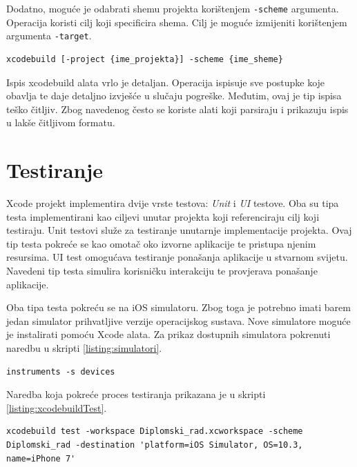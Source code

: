 \documentclass[times, utf8, diplomski, numeric]{fer}
\begin{document}
\begin{appendices}
Dodatno, moguće je odabrati shemu projekta korištenjem \verb|-scheme| argumenta. Operacija koristi cilj koji specificira shema. Cilj je moguće izmijeniti korištenjem argumenta \verb|-target|.

\begin{lstlisting}[caption=Odabir sheme projekta]
xcodebuild [-project {ime_projekta}] -scheme {ime_sheme}
\end{lstlisting}

Ispis xcodebuild alata vrlo je detaljan. Operacija ispisuje sve postupke koje obavlja te daje detaljno izvješće u slučaju pogreške. Međutim, ovaj je tip ispisa teško čitljiv. Zbog navedenog često se koriste alati koji parsiraju i prikazuju ispis u lakše čitljivom formatu.

\section{Testiranje} \label{TestiranjeXcodeBuild}

Xcode projekt implementira dvije vrste testova: \textit{Unit} i \textit{UI} testove. Oba su tipa testa implementirani kao ciljevi unutar projekta koji referenciraju cilj koji testiraju. Unit testovi služe za testiranje unutarnje implementacije projekta. Ovaj tip testa pokreće se kao omotač oko izvorne aplikacije te pristupa njenim resursima. UI test omogućava testiranje ponašanja aplikacije u stvarnom svijetu. Navedeni tip testa simulira korisničku interakciju te provjerava ponašanje aplikacije.

Oba tipa testa pokreću se na iOS simulatoru. Zbog toga je potrebno imati barem jedan simulator prihvatljive verzije operacijskog sustava. Nove simulatore moguće je instalirati pomoću Xcode alata. Za prikaz dostupnih simulatora pokrenuti naredbu u skripti \ref{listing:simulatori}.

\begin{lstlisting}[caption=Ispis dostupnih simulatora, label=listing:simulatori]
instruments -s devices
\end{lstlisting}

Naredba koja pokreće proces testiranja prikazana je u skripti \ref{listing:xcodebuildTest}.

\begin{lstlisting}[caption=Pokretanje testne operaije korištenjem xcodebuild alata, label=listing:xcodebuildTest]
xcodebuild test -workspace Diplomski_rad.xcworkspace -scheme Diplomski_rad -destination 'platform=iOS Simulator, OS=10.3, name=iPhone 7'
\end{lstlisting}


\end{appendices}
\end{document}

